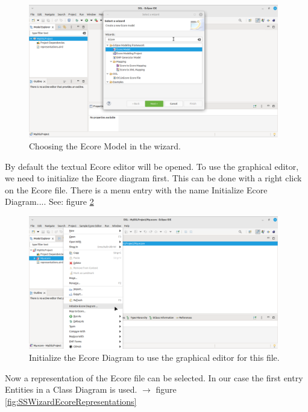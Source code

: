 \documentclass[a4paper,10pt]{article}
\newcommand{\gerquot}[1]{\glqq#1\grqq}
\newcommand{\ScreenshotWidth}{0.975}
\begin{document}
\begin{figure}[H]
\centering
\includegraphics[width=\ScreenshotWidth\textwidth]{./Screenshots/SS_5.png}
\caption{Choosing the Ecore Model in the wizard.}
\label{fig:SSNewEcoreModel2}
\end{figure}

By default the textual Ecore editor will be opened. To use the graphical editor, we need to initialize the Ecore diagram first. This can be done with a right click on the Ecore file. There is a menu entry with the name \gerquot{Initialize Ecore Diagram...}. See: figure \ref{fig:SSInitEcoreDiagram}

\begin{figure}[H]
\centering
\includegraphics[width=\ScreenshotWidth\textwidth]{./Screenshots/SS_7.png}
\caption{Initialize the Ecore Diagram to use the graphical editor for this file.}
\label{fig:SSInitEcoreDiagram}
\end{figure}

Now a representation of the Ecore file can be selected. In our case the first entry \gerquot{Entities in a Class Diagram} is used. $ \rightarrow $ figure \ref{fig:SSWizardEcoreRepresentations}
\end{document}
